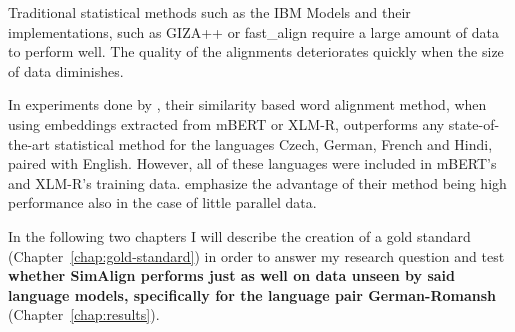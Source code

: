 Traditional statistical methods such as the IBM Models \autocite{brown-etal-1993-mathematics} and their implementations, such as GIZA++ \autocite{och-ney-2003-smt} or fast\_align \autocite{dyer-etal-2013-simple} require a large amount of data to perform well.
The quality of the alignments deteriorates quickly when the size of data diminishes\footnotemark. 


In experiments done by \cite{jalili-sabet-etal-2020-simalign}, their similarity based word alignment method, when using embeddings extracted from mBERT or XLM-R, outperforms any state-of-the-art statistical method for the languages Czech, German, French and Hindi, paired with English. 
However, all of these languages were included in mBERT's and XLM-R's training data. 
\cite{jalili-sabet-etal-2020-simalign} emphasize the advantage of their method being high performance also in the case of little  parallel data.

In the following two chapters I will describe the creation of a gold standard (Chapter~\ref{chap:gold-standard}) in order to answer my research question and test \textbf{whether SimAlign performs just as well on data unseen by said language models, specifically for the language pair German-Romansh} (Chapter~\ref{chap:results}).



